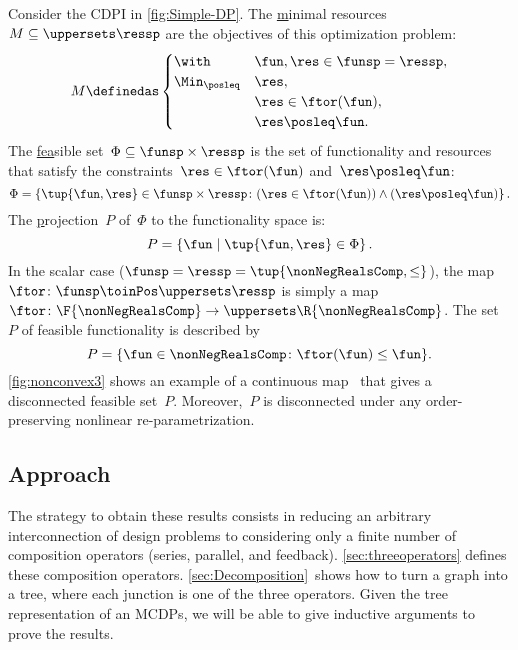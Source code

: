 \begin{example}
    \label{exa:one}
    Consider the CDPI in \cref{fig:Simple-DP}.
    The \uline{m}inimal resources~$M\subseteq\uppersets \ressp$ are the objectives of this optimization problem:
    \begin{equation*}
        M\definedas\begin{cases}
                       \with & \fun,\res\in\funsp=\ressp,\\
                       \Min_{\posleq} & \res,\\
                       & \res\in\ftor(\fun),\\
                       & \res\posleq\fun.
        \end{cases}
    \end{equation*}
    The \uline{fea}sible %
    set~$\Phi\subseteq\funsp\times\ressp$ is
    the set of functionality and resources that satisfy the constraints~$\res\in\ftor(\fun)$
    and~$\res\posleq\fun$:
    \begin{equation}
        \Phi=\left\{ \tup{\fun,\res}\in\funsp\times\ressp\colon (\res\in\ftor(\fun))\wedge(\res\posleq\fun)\right\} .\label{eq:feasible}
    \end{equation}
    The \uline{p}rojection~$P$ of~$\Phi$ to the functionality space
    is:
    \begin{equation*}
        P=\left\{ \fun\mid\tup{\fun,\res} \in\Phi\right\}.
    \end{equation*}
    In the scalar case ($\funsp=\ressp=\tup{\nonNegRealsComp,\leq}$),
    the map~$\ftor\colon\funsp\toinPos\uppersets \ressp$ is simply a map~$\ftor\colon\F{\nonNegRealsComp}\to \uppersets\R{\nonNegRealsComp}$.
    The set~$P$ of feasible functionality is described by
    \begin{equation}
        P=\{\fun\in\nonNegRealsComp\colon \ftor(\fun)\leq\fun\}.\label{eq:Pfeasible}
    \end{equation}
    \cref{fig:nonconvex3} shows an example of a continuous map~\ftor
    that gives a disconnected feasible set~$P$. Moreover,~$P$ is disconnected
    under any order-preserving nonlinear re-parametrization.

\end{example}

\subsection{Approach}

The strategy to obtain these results  consists in reducing an arbitrary
interconnection of design problems to considering only a finite
number of composition operators (series, parallel, and feedback).
\cref{sec:threeoperators} defines these composition operators. \cref{sec:Decomposition}~shows
how to turn a graph into a tree, where each junction is one of the
three operators. Given the tree representation of an MCDPs, we will
be able to give inductive arguments to prove the results.

